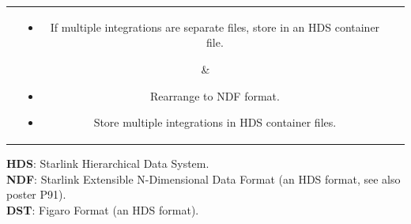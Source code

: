 \documentclass[a0paper,portrait]{baposter}
\begin{document}
\begin{poster}
{\begin{centering}
\begin{tabular}[t]{ccc}
    &

    \parbox[t]{1.8in}{\begin{itemize}[label={--},topsep=0pt]
    \raggedright
    \item
    If multiple integrations are separate files,
    store in an HDS container file.
    \end{itemize}}

    &

    \parbox[t]{1.8in}{\begin{itemize}[label={--},topsep=0pt]
    \raggedright
    \item
    Rearrange to NDF format.

    \raggedright
    \item
    Store multiple integrations in HDS container files.
    \end{itemize}}

    \end{tabular}
    \end{centering}

    \quad

    \quad

    \smaller[2]
    \textbf{HDS}: Starlink Hierarchical Data System. \\
    \textbf{NDF}: Starlink Extensible N-Dimensional Data Format (an HDS format, see also poster P91). \\
    \textbf{DST}: Figaro Format (an HDS format). \\
}



\end{poster}
\end{document}
